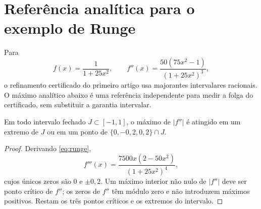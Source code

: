 \section{Referência analítica para o exemplo de Runge}
Para
\begin{equation}
 f(x)=\frac{1}{1+25x^2},\qquad
 f''(x)=\frac{50(75x^2-1)}{(1+25x^2)^3},
 \label{eq:runge}
\end{equation}
o refinamento certificado do primeiro artigo usa majorantes intervalares racionais. O máximo analítico abaixo é uma referência independente para medir a folga do certificado, sem substituir a garantia intervalar.

\begin{lemma}\label{lem:runge-majorant}
Em todo intervalo fechado $J\subset[-1,1]$, o máximo de $|f''|$ é atingido em um extremo de $J$ ou em um ponto de $\{0,-0{,}2,0{,}2\}\cap J$.
\end{lemma}

\begin{proof}
Derivando \eqref{eq:runge},
\[
 f'''(x)=\frac{7500x(2-50x^2)}{(1+25x^2)^4},
\]
cujos únicos zeros são $0$ e $\pm0{,}2$. Um máximo interior não nulo de $|f''|$ deve ser ponto crítico de $f''$; os zeros de $f''$ têm módulo zero e não introduzem máximos positivos. Restam os três pontos críticos e os extremos do intervalo.
\end{proof}
